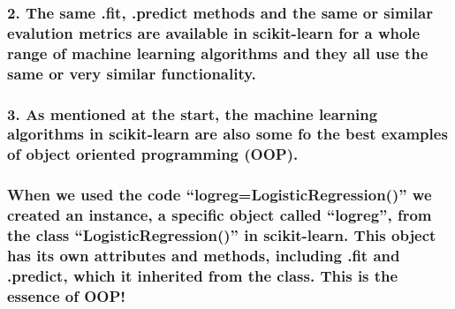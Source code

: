 \documentclass[11pt]{article}
\begin{document}
    \hypertarget{the-same-.fit-.predict-methods-and-the-same-or-similar-evalution-metrics-are-available-in-scikit-learn-for-a-whole-range-of-machine-learning-algorithms-and-they-all-use-the-same-or-very-similar-functionality.}{%
\subsubsection{2. The same .fit, .predict methods and the same or
similar evalution metrics are available in scikit-learn for a whole
range of machine learning algorithms and they all use the same or very
similar
functionality.}\label{the-same-.fit-.predict-methods-and-the-same-or-similar-evalution-metrics-are-available-in-scikit-learn-for-a-whole-range-of-machine-learning-algorithms-and-they-all-use-the-same-or-very-similar-functionality.}}

    \hypertarget{as-mentioned-at-the-start-the-machine-learning-algorithms-in-scikit-learn-are-also-some-fo-the-best-examples-of-object-oriented-programming-oop.}{%
\subsubsection{3. As mentioned at the start, the machine learning
algorithms in scikit-learn are also some fo the best examples of object
oriented programming
(OOP).}\label{as-mentioned-at-the-start-the-machine-learning-algorithms-in-scikit-learn-are-also-some-fo-the-best-examples-of-object-oriented-programming-oop.}}

\hypertarget{when-we-used-the-code-logreglogisticregression-we-created-an-instance-a-specific-object-called-logreg-from-the-class-logisticregression-in-scikit-learn.-this-object-has-its-own-attributes-and-methods-including-.fit-and-.predict-which-it-inherited-from-the-class.-this-is-the-essence-of-oop}{%
\subsubsection{When we used the code ``logreg=LogisticRegression()'' we
created an instance, a specific object called ``logreg'', from the class
``LogisticRegression()'' in scikit-learn. This object has its own
attributes and methods, including .fit and .predict, which it inherited
from the class. This is the essence of
OOP!}\label{when-we-used-the-code-logreglogisticregression-we-created-an-instance-a-specific-object-called-logreg-from-the-class-logisticregression-in-scikit-learn.-this-object-has-its-own-attributes-and-methods-including-.fit-and-.predict-which-it-inherited-from-the-class.-this-is-the-essence-of-oop}}
\end{document}
